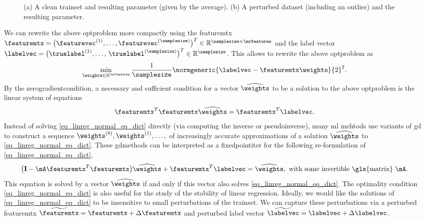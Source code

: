 {{\begin{figure}[H]
{		(a) A clean \gls{trainset} and resulting \gls{parameter} (given by the average). 
		 (b) A perturbed \gls{dataset} (including an \gls{outlier}) 
		 and the resulting \gls{parameter}. \label{fig_linreg_dict}}
		 \end{figure}
		We can rewrite the above \gls{optproblem} more compactly using the 
		 \gls{featuremtx} $\featuremtx = \big(\featurevec^{(1)},\ldots,\featurevec^{(\samplesize)}\big)^{T} \in \mathbb{R}^{\samplesize \times \nrfeatures}$ 
		and the \gls{label} \gls{vector} $\labelvec = \big( \truelabel^{(1)},\ldots, \,\truelabel^{(\samplesize)} \big)^{T} \in \mathbb{R}^{\samplesize}$. 
		 This allows to rewrite the above \gls{optproblem} as
		 $$\min_{\weights \in \mathbb{R}^{\nrfeatures}} \frac{1}{\samplesize} \normgeneric{\labelvec - \featuremtx \weights}{2}^{2}.$$
		 By the \gls{zerogradientcondition}, a necessary and sufficient condition for a 
		 vector $\widehat{\weights}$ to be a solution to the above \gls{optproblem} is the 
		 linear system of equations \cite{StrangLinAlg2016}
		 \begin{equation} 
			\label{eq_linreg_normal_eq_dict}
			\featuremtx^{T}\featuremtx \widehat{\weights} = \featuremtx^{T} \labelvec.
		 \end{equation}
		 Instead of solving \eqref{eq_linreg_normal_eq_dict} directly 
		 (via computing the \gls{inverse} or \gls{pseudoinverse}), 
		 many \gls{ml} mehtods use variants of \gls{gd} to construct a sequence 
		 $\weights^{(0)},\weights^{(1)},\ldots,$ of increasingly accurate approximations 
		 of a solution $\widehat{\weights}$ to \eqref{eq_linreg_normal_eq_dict}. These 
		 \glspl{gdmethod} can be interpreted as a \gls{fixedpointiter} for the following 
		 re-formulation of \eqref{eq_linreg_normal_eq_dict}, 
		 $$ \big(\mathbf{I} - \mA \featuremtx^{T}\featuremtx\big) \widehat{\weights} + \featuremtx^{T} 
		 \labelvec = \widehat{\weights}, \mbox{ with some invertible \gls{matrix} } \mA.$$
		 This equation is solved by a \gls{vector} $\widehat{\weights}$ if and only if 
		 this \gls{vector} also solves \eqref{eq_linreg_normal_eq_dict}. The optimality 
		  condition \eqref{eq_linreg_normal_eq_dict} is also useful for the study of 
		  the \gls{stability} of linear \gls{regression}. Ideally, we would like the solutions of 
		  \eqref{eq_linreg_normal_eq_dict} to be insensitive to small perturbations 
		  of the \gls{trainset}. We can capture these perturbations via a 
		  perturbed \gls{featuremtx} $\widetilde{\featuremtx} = \featuremtx + \Delta \featuremtx$
		  and perturbed \gls{label} 
		  \gls{vector} $\widetilde{\labelvec} = \labelvec + \Delta \labelvec$. 
}}
